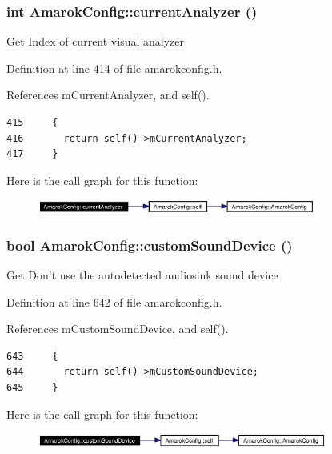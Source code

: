 \subsubsection{\setlength{\rightskip}{0pt plus 5cm}int Amarok\-Config::current\-Analyzer ()\hspace{0.3cm}{\tt  [inline, static]}}\label{classAmarokConfig_AmarokConfige42}


Get Index of current visual analyzer 

Definition at line 414 of file amarokconfig.h.

References m\-Current\-Analyzer, and self().



\footnotesize\begin{verbatim}415     {
416       return self()->mCurrentAnalyzer;
417     }
\end{verbatim}\normalsize 


Here is the call graph for this function:\begin{figure}[H]
\begin{center}
\leavevmode
\includegraphics[width=259pt]{classAmarokConfig_AmarokConfige42_cgraph}
\end{center}
\end{figure}
\subsubsection{\setlength{\rightskip}{0pt plus 5cm}bool Amarok\-Config::custom\-Sound\-Device ()\hspace{0.3cm}{\tt  [inline, static]}}\label{classAmarokConfig_AmarokConfige66}


Get Don't use the autodetected audiosink sound device 

Definition at line 642 of file amarokconfig.h.

References m\-Custom\-Sound\-Device, and self().



\footnotesize\begin{verbatim}643     {
644       return self()->mCustomSoundDevice;
645     }
\end{verbatim}\normalsize 


Here is the call graph for this function:\begin{figure}[H]
\begin{center}
\leavevmode
\includegraphics[width=269pt]{classAmarokConfig_AmarokConfige66_cgraph}
\end{center}
\end{figure}
